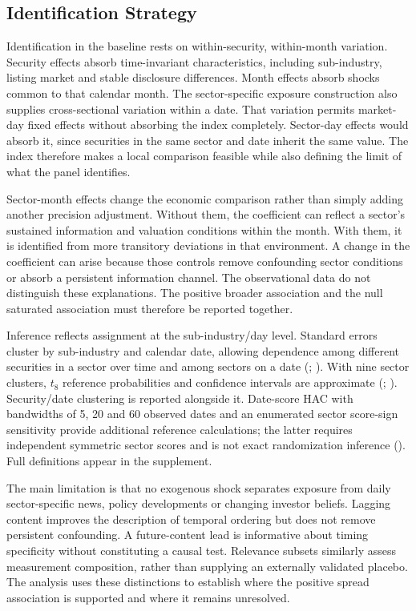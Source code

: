 \documentclass{article}
\theoremstyle{plain}
\begin{document}
\subsection{Identification Strategy}
Identification in the baseline rests on within-security, within-month variation. Security effects absorb time-invariant characteristics, including sub-industry, listing market and stable disclosure differences. Month effects absorb shocks common to that calendar month. The sector-specific exposure construction also supplies cross-sectional variation within a date. That variation permits market-day fixed effects without absorbing the index completely. Sector-day effects would absorb it, since securities in the same sector and date inherit the same value. The index therefore makes a local comparison feasible while also defining the limit of what the panel identifies.

Sector-month effects change the economic comparison rather than simply adding another precision adjustment. Without them, the coefficient can reflect a sector's sustained information and valuation conditions within the month. With them, it is identified from more transitory deviations in that environment. A change in the coefficient can arise because those controls remove confounding sector conditions or absorb a persistent information channel. The observational data do not distinguish these explanations. The positive broader association and the null saturated association must therefore be reported together.

Inference reflects assignment at the sub-industry/day level. Standard errors cluster by sub-industry and calendar date, allowing dependence among different securities in a sector over time and among sectors on a date (\cite{Moulton1990}; \cite{Petersen2009}). With nine sector clusters, $t_8$ reference probabilities and confidence intervals are approximate (\cite{CameronMiller2015}; \cite{MacKinnonNielsenWebb2023}). Security/date clustering is reported alongside it. Date-score HAC with bandwidths of 5, 20 and 60 observed dates and an enumerated sector score-sign sensitivity provide additional reference calculations; the latter requires independent symmetric sector scores and is not exact randomization inference (\cite{DriscollKraay1998}). Full definitions appear in the supplement.

The main limitation is that no exogenous shock separates exposure from daily sector-specific news, policy developments or changing investor beliefs. Lagging content improves the description of temporal ordering but does not remove persistent confounding. A future-content lead is informative about timing specificity without constituting a causal test. Relevance subsets similarly assess measurement composition, rather than supplying an externally validated placebo. The analysis uses these distinctions to establish where the positive spread association is supported and where it remains unresolved.
\end{document}
